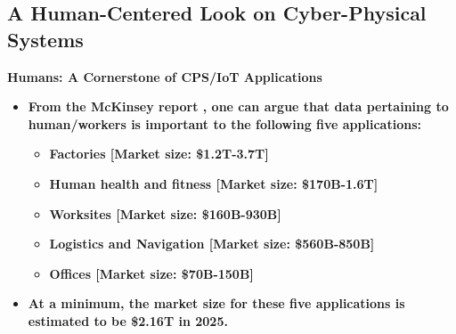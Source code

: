 \documentclass[aspectratio=43]{beamer}
\begin{document}
\subsection{A Human-Centered Look on Cyber-Physical Systems}
\begin{frame}{\textbf{Humans: A Cornerstone of CPS/IoT Applications}}
    \begin{itemize}
        \item<1-5> \textbf{From the McKinsey report \cite{mckinsey2015}, one can argue that data pertaining to human/workers is important to the following five applications:}
        \begin{itemize}[<+>]
            \item \textbf{Factories [Market size: \$1.2T-3.7T]}
            \item \textbf{Human health and fitness [Market size: \$170B-1.6T]}
            \item \textbf{Worksites [Market size: \$160B-930B]}
            \item \textbf{Logistics and Navigation [Market size: \$560B-850B]}
            \item \textbf{Offices [Market size: \$70B-150B]}
        \end{itemize}
        \item<6> \textbf{At a minimum, the market size for these five applications is estimated to be \$2.16T in 2025.}
    \end{itemize}
    
\end{frame}
\end{document}
